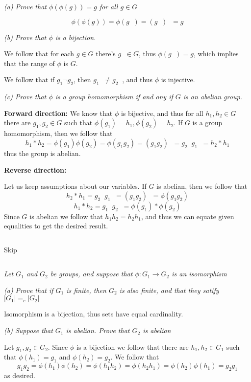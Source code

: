 \documentclass[11pt,oneside,titlepage]{book}
\DeclareMathOperator \inv {^{-1}}
\begin{document}
\textit{(a) Prove that $\phi(\phi(g)) = g$ for all $g \in G$}

$$\phi(\phi(g)) = \phi(g\inv) = (g\inv)\inv = g$$

\textit{(b) Prove that $\phi$ is a bijection.}

We follow that for each $g \in G$ there's $g\inv \in G$, thus
$\phi(g\inv) = g$, which implies that the range of $\phi$ is $G$.

We follow that if $g_1 \neg g_2$, then $g_1\inv \neq g_2\inv$, and thus
$\phi$ is injective.

\textit{(c) Prove that $\phi$ is a group homomorphism if and ony if
  $G$ is an abelian group.}

\textbf{Forward direction:}
We know that $\phi$ is bijective, and thus for all $h_1, h_2 \in G$
there are $g_1, g_2 \in G$ such that $\phi(g_1) = h_1, \phi(g_2) =
h_2$. If $G$ is a group homomorphism, then we follow that
$$h_1 * h_2 = \phi(g_1) \phi(g_2) = \phi(g_1 g_2) = (g_1 g_2)\inv = g_2\inv g_1 \inv = h_2 * h_1$$
thus the group is abelian.

\textbf{Reverse direction:}

Let us keep assumptions about our variables. If $G$ is abelian, then
we follow that
$$h_2 * h_1 = g_2\inv g_1 \inv  =  (g_1 g_2)\inv  = \phi(g_1 g_2)$$
$$h_1 * h_2 = g_1\inv g_2 \inv  =  \phi(g_1) * \phi(g_2)$$
Since $G$ is abelian we follow that $h_1 h_2 = h_2 h_1$, and thus
we can equate given equalities to get the desired result.

\subsection{}

Skip

\subsection{}

\textit{Let $G_1$ and $G_2$ be groups, and suppose that $\phi: G_1 \to
  G_2$ is an isomorphism}

\textit{(a) Prove that if $G_1$ is finite, then $G_2$ is also finite, and
  that they satify $|G_1| =_c |G_2|$}

Isomorphism is a bijection, thus sets have equal cardinality.

\textit{(b) Suppose that $G_1$ is abelian. Prove that $G_2$ is
abelian}

Let $g_1, g_2 \in G_2$. Since $\phi$ is a bijection we follow that there are
$h_1, h_2 \in G_1$ such that $\phi(h_1) = g_1$ and $\phi(h_2) = g_2$.
We follow that
$$g_1 g_2 = \phi(h_1) \phi(h_2) = \phi(h_1 h_2) = \phi(h_2 h_1) = \phi(h_2) \phi(h_1) = g_2 g_1$$
as desired.
\end{document}
